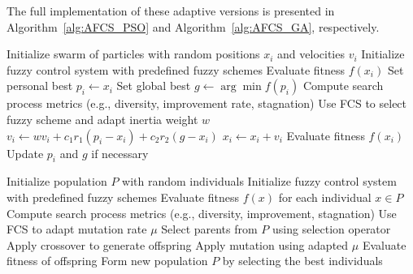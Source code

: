 The full implementation of these adaptive versions is presented in Algorithm~\ref{alg:AFCS_PSO} and Algorithm~\ref{alg:AFCS_GA}, respectively.

\begin{algorithm}[H]
\caption{Adaptive PSO with Fuzzy Control System (FCS)}\label{alg:AFCS_PSO}
\begin{algorithmic}[1]
\State Initialize swarm of particles with random positions $x_i$ and velocities $v_i$
\State Initialize fuzzy control system with predefined fuzzy schemes
    \State Evaluate fitness $f(x_i)$
    \State Set personal best $p_i \gets x_i$
\EndFor
\State Set global best $g \gets \arg\min f(p_i)$
    \State Compute search process metrics (e.g., diversity, improvement rate, stagnation)
    \State Use FCS to select fuzzy scheme and adapt inertia weight $w$
        \State $v_i \gets w v_i + c_1 r_1 (p_i - x_i) + c_2 r_2 (g - x_i)$
        \State $x_i \gets x_i + v_i$
        \State Evaluate fitness $f(x_i)$
        \State Update $p_i$ and $g$ if necessary
    \EndFor
\EndWhile
\end{algorithmic}
\end{algorithm}




\begin{algorithm}[H]
\caption{Adaptive GA with Fuzzy Control System (FCS)}\label{alg:AFCS_GA}
\begin{algorithmic}[1]
\State Initialize population $P$ with random individuals
\State Initialize fuzzy control system with predefined fuzzy schemes
\State Evaluate fitness $f(x)$ for each individual $x \in P$
    \State Compute search process metrics (e.g., diversity, improvement, stagnation)
    \State Use FCS to adapt mutation rate $\mu$
    \State Select parents from $P$ using selection operator
    \State Apply crossover to generate offspring
    \State Apply mutation using adapted $\mu$
    \State Evaluate fitness of offspring
    \State Form new population $P$ by selecting the best individuals
\EndWhile
\end{algorithmic}
\end{algorithm}





